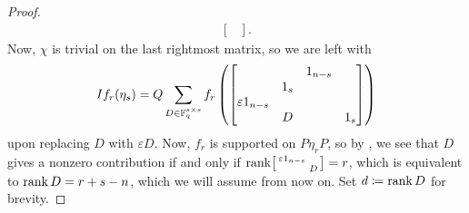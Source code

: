 \begin{proof}
\begin{align*}
\begin{bmatrix}
		\end{bmatrix}.
	\end{align*}
	Now, $\chi$ is trivial on the last rightmost matrix,
    so we are left with
	\[If_r(\eta_s)=Q\sum_{D\in\mathbb F_q^{s\times s}}f_r\left(\begin{bmatrix}
		&& 1_{n-s} \\ & 1_s \\
		\varepsilon1_{n-s} &   &   \\ &  D &   & 1_s
	\end{bmatrix}\right)\]
    upon replacing $D$ with $\varepsilon D$.
	Now, $f_r$ is supported on $P\eta_rP$, so by , we see that $D$ gives a nonzero contribution if and only if \(\operatorname{rank}\begin{bsmallmatrix}
		\varepsilon1_{n-s} \\ & D
	\end{bsmallmatrix}=r\), which is equivalent to $\operatorname{rank}D=r+s-n$, which we will assume from now on. Set $d\coloneqq\operatorname{rank}D$ for brevity.
	

\end{proof}
